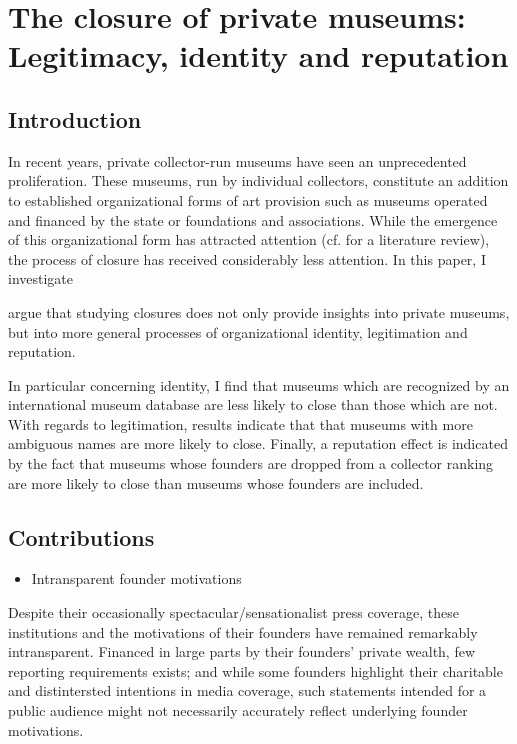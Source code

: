 \documentclass[11pt]{article}
\author{Johannes }
\date{\today}
\title{}
\begin{document}
\section*{The closure of private museums: Legitimacy, identity and reputation}



\subsection*{Introduction}


In recent years, private collector-run museums have seen an unprecedented proliferation.
These museums, run by individual collectors, constitute an addition to established organizational forms of art provision such as museums operated and financed by the state or foundations and associations.
While the emergence of this organizational form has attracted attention (cf. \cite{Kolbe_etal_2022_privatemuseum} for a literature review), the process of closure has received considerably less attention.
In this paper, I investigate

argue that studying closures does not only provide insights into private museums, but into more general processes of organizational identity, legitimation and reputation. 



In particular concerning identity, I find that museums which are recognized by an international museum database are less likely to close than those which are not.
With regards to legitimation, results indicate that that museums with more ambiguous names are more likely to close.
Finally, a reputation effect is indicated by the fact that museums whose founders are dropped from a collector ranking are more likely to close than museums whose founders are included. 



\subsection*{Contributions}

\begin{itemize}
\item Intransparent founder motivations
\end{itemize}

Despite their occasionally spectacular/sensationalist press coverage, these institutions and the motivations of their founders have remained remarkably intransparent.
Financed in large parts by their founders' private wealth, few reporting requirements exists; and while some founders highlight their charitable and distintersted intentions in media coverage, such statements intended for a public audience might not necessarily accurately reflect underlying founder motivations.
\end{document}
